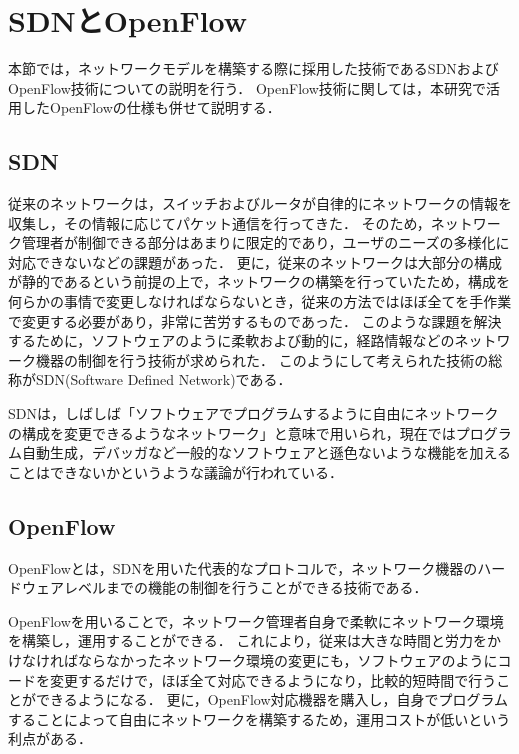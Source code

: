 \section{SDNとOpenFlow}

本節では，ネットワークモデルを構築する際に採用した技術であるSDNおよびOpenFlow技術についての説明を行う．
OpenFlow技術に関しては，本研究で活用したOpenFlowの仕様も併せて説明する．

\subsection{SDN}

従来のネットワークは，スイッチおよびルータが自律的にネットワークの情報を収集し，その情報に応じてパケット通信を行ってきた\cite{openflownet}．
そのため，ネットワーク管理者が制御できる部分はあまりに限定的であり，ユーザのニーズの多様化に対応できないなどの課題があった．
更に，従来のネットワークは大部分の構成が静的であるという前提の上で，ネットワークの構築を行っていたため，構成を何らかの事情で変更しなければならないとき，従来の方法ではほぼ全てを手作業で変更する必要があり，非常に苦労するものであった．
このような課題を解決するために，ソフトウェアのように柔軟および動的に，経路情報などのネットワーク機器の制御を行う技術が求められた．
このようにして考えられた技術の総称がSDN(Software Defined Network)である．

SDNは，しばしば「ソフトウェアでプログラムするように自由にネットワークの構成を変更できるようなネットワーク」と意味で用いられ\cite{openflowjapanese}，現在ではプログラム自動生成，デバッガなど一般的なソフトウェアと遜色ないような機能を加えることはできないかというような議論が行われている．

\subsection{OpenFlow}

OpenFlowとは，SDNを用いた代表的なプロトコルで，ネットワーク機器のハードウェアレベルまでの機能の制御を行うことができる技術である\cite{openflowjapanese}．

OpenFlowを用いることで，ネットワーク管理者自身で柔軟にネットワーク環境を構築し，運用することができる．
これにより，従来は大きな時間と労力をかけなければならなかったネットワーク環境の変更にも，ソフトウェアのようにコードを変更するだけで，ほぼ全て対応できるようになり，比較的短時間で行うことができるようになる．
更に，OpenFlow対応機器を購入し，自身でプログラムすることによって自由にネットワークを構築するため，運用コストが低いという利点がある．


